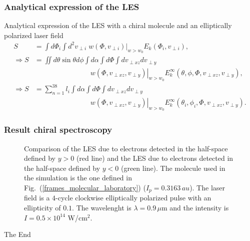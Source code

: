 \documentclass{beamer}
\begin{document}
\begin{frame}
\frametitle{Analytical expression of the LES}
Analytical expression of the LES with a chiral molecule and an elliptically polarized laser field 
\begin{align}
S&= \int d\Phi_{i} \int d^{2}v_{\perp i}  \; \left. w(\Phi, v_{\perp i}) \right\vert_{w>w_{0}}  E_{k}(\Phi_{i}, v_{\perp i}), \\
\Rightarrow S&=\iint d\theta \sin{\theta} d\phi \int d\alpha \int d\Phi \int dv_{\perp xz}dv_{\perp y} \, \\ 
& \qquad \qquad \qquad \qquad \left.  w(\Phi, v_{\perp xz}, v_{\perp y}) \right\vert_{w>w_{0}}E_{k}^{\infty}(\theta, \phi, \Phi, v_{\perp xz}, v_{\perp y}), \\
\Rightarrow S&=\sum_{n=1}^{38} l_{i} \int d\alpha \int d\Phi \int dv_{\perp xz}dv_{\perp y} \, \\ 
& \qquad \qquad \qquad \qquad \left. w(\Phi, v_{\perp xz}, v_{\perp y}) \right\vert_{w>w_{0}} E_{k}^{\infty}(\theta_{i}, \phi_{i}, \Phi, v_{\perp xz}, v_{\perp y}).
\end{align}
\end{frame}


\begin{frame}
\frametitle{Result chiral spectroscopy}

\begin{figure}[htp]
\begin{subfigure} [htp]{0.3\textwidth}
\hspace{-1cm}
  \raisebox{17px}{\resizebox{0.983\textwidth}{!}{}}
 \label{KastnerLES} 
\end{subfigure}
\begin{subfigure} [htp]{0.3\textwidth}
\hspace{-0.5cm}
  \raisebox{17px}{\resizebox{0.983\textwidth}{!}{}}
 \label{myLES} 
\end{subfigure}
\begin{subfigure} [htp]{0.7\textwidth}
\hspace{-0.5cm}
  \raisebox{17px}{\resizebox{0.983\textwidth}{!}{}}
 \label{myLES} 
\end{subfigure}
 \caption{Comparison of the LES due to electrons detected in the half-space defined by $y>0$ (red line) and the LES due to electrons detected in the half-space defined by $y<0$ (green line). The molecule used in the simulation is the one defined in Fig.~(\ref{frames_molecular_laboratory}) ($I_{p}=0.3163\,au$). The laser field is a $4$-cycle clockwise elliptically polarized pulse with an ellipticity of $0.1$. The wavelenght is $\lambda=0.9\,\mu$m and the intensity is $I=0.5\times10^{14}$ W/cm$^{2}$. \label{leb_sum}}
\end{figure}

\end{frame}


\begin{frame}
\Huge{\centerline{The End}}
\end{frame}

\end{document}
